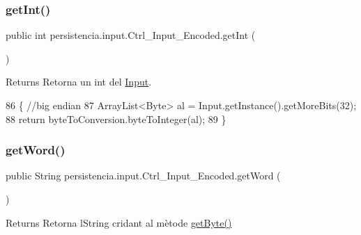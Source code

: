 \subsubsection{\texorpdfstring{get\+Int()}{getInt()}}
{\footnotesize\ttfamily public int persistencia.\+input.\+Ctrl\+\_\+\+Input\+\_\+\+Encoded.\+get\+Int (\begin{DoxyParamCaption}{ }\end{DoxyParamCaption})\hspace{0.3cm}{\ttfamily [inline]}}

\begin{DoxyReturn}{Returns}
Retorna un int del \hyperlink{classpersistencia_1_1input_1_1Input}{Input}. 
\end{DoxyReturn}

\begin{DoxyCode}
86                         \{ \textcolor{comment}{//big endian}
87         ArrayList<Byte> al = Input.getInstance().getMoreBits(32);
88         \textcolor{keywordflow}{return} byteToConversion.byteToInteger(al);
89     \}
\end{DoxyCode}
\mbox{\label{classpersistencia_1_1input_1_1Ctrl__Input__Encoded_a87ebc4b52c5884ba9c397558668e67d7}} 
\subsubsection{\texorpdfstring{get\+Word()}{getWord()}}
{\footnotesize\ttfamily public String persistencia.\+input.\+Ctrl\+\_\+\+Input\+\_\+\+Encoded.\+get\+Word (\begin{DoxyParamCaption}{ }\end{DoxyParamCaption})\hspace{0.3cm}{\ttfamily [inline]}}

\begin{DoxyReturn}{Returns}
Retorna l\textquotesingle{}String cridant al mètode \hyperlink{classpersistencia_1_1input_1_1Ctrl__Input__Encoded_a38ede6bc49251e77ae4be30ccc06457d}{get\+Byte()} 
\end{DoxyReturn}

